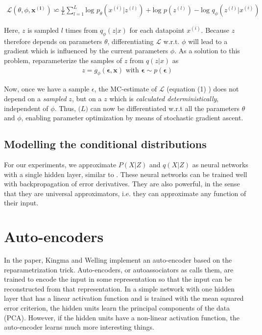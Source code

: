 \documentclass{article}
\begin{document}
\begin{align}
\mathcal{L}(\theta ,\phi ,  \mathbf{x^{(i)}}) \backsimeq \frac{1}{L} \sum_{l=1}^{L} \text{log } p_{\theta} (x^{(i)}|z^{(l)})+ \text{log }p(z^{(l)}	)-\text{log }q_{\phi}(z^{(l)}|x^{(i)})
\end{align}

Here, $z$ is sampled $l$ times from $q_{\phi}(z|x)$ for each datapoint $x^{(i)}$. Because $z$ therefore depends on parameters $\theta$, differentiating $\mathcal{L}$ w.r.t. $\phi$ will lead to a gradient which is influenced by the current parameters $\phi$. 
As a solution to this problem, \cite{kingma2013auto} reparameterize the samples of $z$ from $q(z|x)$ as
\begin{align}
z = g_\phi(\mathbf{\epsilon},\mathbf{x}) \text{  with  } \mathbf{\epsilon} \sim p(\mathbf{\epsilon}) 
\end{align} 

Now, once we have a sample $\epsilon$, the MC-estimate of $\mathcal{L}$ (equation (1) ) does not depend on a \textit{sampled} $z$, but on a  $z$ which is \textit{calculated deterministically}, independent of $\phi$. Thus, $\mathcal(L)$ can now be differentiated w.r.t all the parameters $\theta$ and $\phi$, enabling parameter optimization by means of stochastic gradient ascent.

\subsection{Modelling the conditional distributions}
For our experiments, we approximate $P(X|Z)$ and $q(X|Z)$ as neural networks with a single hidden layer, similar to \cite{kingma2013auto}. These neural networks can be trained well with backpropagation of error derivatives. They are also powerful, in the sense that they are universal approximators, i.e. they can approximate any function of their input. 

\section{Auto-encoders}

In the paper, Kingma and Welling implement an auto-encoder based on the reparametrization trick. Auto-encoders, or autoassociators as \cite{bengio2009learning} calls them, are trained to encode the input in some representation so that the input can be reconstructed from that representation. In a simple network with one hidden layer that has a linear activation function and is trained with the mean squared error criterion, the hidden units learn the principal components of the data (PCA). However, if the hidden units have a non-linear activation function, the auto-encoder learns much more interesting things.
\end{document}
